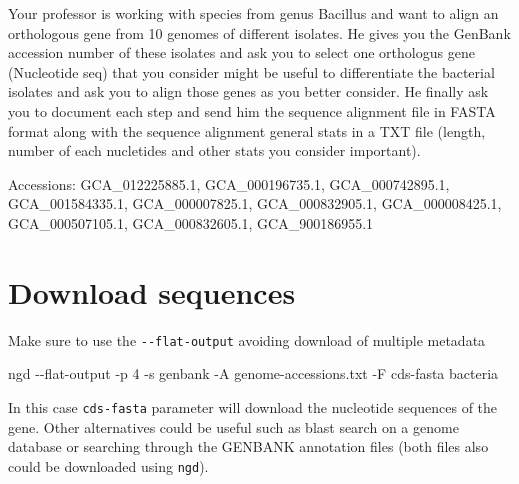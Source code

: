 \documentclass[
  letterpaper,
  DIV=11,
  numbers=noendperiod]{scrreprt}
\newenvironment{Shaded}{\begin{snugshade}}{\end{snugshade}}
\newcommand{\AttributeTok}[1]{\textcolor[rgb]{0.40,0.46,0.14}{#1}}
\newcommand{\ExtensionTok}[1]{\textcolor[rgb]{0.00,0.46,0.62}{#1}}
\newcommand{\NormalTok}[1]{\textcolor[rgb]{0.00,0.46,0.62}{#1}}
\begin{document}
\begin{tcolorbox}[standard jigsaw,rightrule=.15mm, bottomtitle=1mm, toprule=.15mm, titlerule=0mm, toptitle=1mm, opacitybacktitle=0.6, arc=.35mm, colframe=quarto-callout-warning-color-frame, colbacktitle=quarto-callout-warning-color!10!white, coltitle=black, title=\textcolor{quarto-callout-warning-color}{\faExclamationTriangle}\hspace{0.5em}{Challenge}, bottomrule=.15mm, colback=white, leftrule=.75mm, left=2mm, opacityback=0]
Your professor is working with species from genus Bacillus and want to
align an orthologous gene from 10 genomes of different isolates. He
gives you the GenBank accession number of these isolates and ask you to
select one orthologus gene (Nucleotide seq) that you consider might be
useful to differentiate the bacterial isolates and ask you to align
those genes as you better consider. He finally ask you to document each
step and send him the sequence alignment file in FASTA format along with
the sequence alignment general stats in a TXT file (length, number of
each nucletides and other stats you consider important).

Accessions: GCA\_012225885.1, GCA\_000196735.1, GCA\_000742895.1,
GCA\_001584335.1, GCA\_000007825.1, GCA\_000832905.1, GCA\_000008425.1,
GCA\_000507105.1, GCA\_000832605.1, GCA\_900186955.1
\end{tcolorbox}

\hypertarget{download-sequences}{%
\section*{Download sequences}\label{download-sequences}}

Make sure to use the \texttt{-\/-flat-output} avoiding download of
multiple metadata

\begin{Shaded}
\begin{Highlighting}[]
\ExtensionTok{ngd} \AttributeTok{{-}{-}flat{-}output} \AttributeTok{{-}p}\NormalTok{ 4 }\AttributeTok{{-}s}\NormalTok{ genbank }\AttributeTok{{-}A}\NormalTok{ genome{-}accessions.txt }\AttributeTok{{-}F}\NormalTok{ cds{-}fasta bacteria}
\end{Highlighting}
\end{Shaded}

In this case \texttt{cds-fasta} parameter will download the nucleotide
sequences of the gene. Other alternatives could be useful such as blast
search on a genome database or searching through the GENBANK annotation
files (both files also could be downloaded using \texttt{ngd}).
\end{document}
